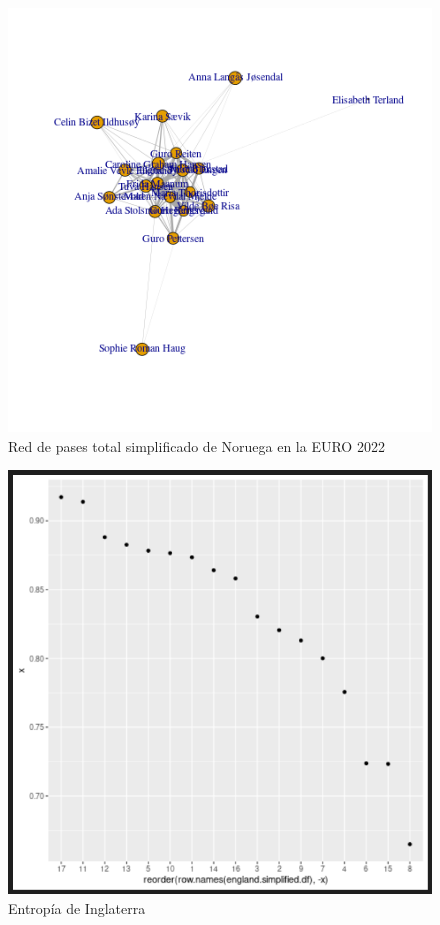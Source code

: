 \begin{figure}[ht!]
    \centering
     \includegraphics[width=\textwidth]{./img/plot_norw_simpl.png}
     \caption{Red de pases total simplificado de Noruega en la EURO 2022}
     \label{img:red:nor}
\end{figure}

\begin{figure}[ht!]
    \centering
     \includegraphics[width=\textwidth]{./img/englandentropy.png}
     \caption{Entropía de Inglaterra}
     \label{img:red:eng:ent}
\end{figure}

